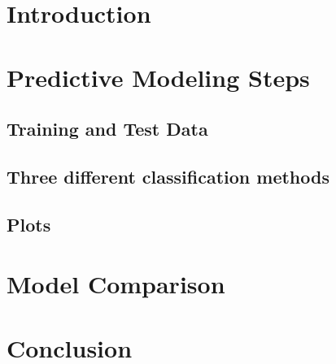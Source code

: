 \chapter{Introduction}

\chapter{Predictive Modeling Steps}

\section{Training and Test Data}

\section{Three different classification methods}

\section{Plots}

\chapter{Model Comparison}

\chapter{Conclusion}
